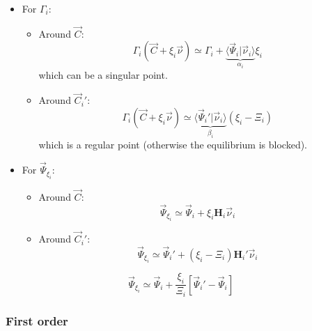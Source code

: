 \documentclass[aps,12pt]{revtex4}
\begin{document}
\begin{itemize} 
\item For $\Gamma_i$:%

\begin{itemize}
\item Around $\vec{C}$: 	
\begin{equation}
	\Gamma_i(\vec{C}+\xi_i\vec{\nu}) \simeq \Gamma_i + \underbrace{\langle \vec{\Psi}_i \vert \vec{\nu}_i\rangle}_{\alpha_i} \xi_i
\end{equation}
which can be a singular point.

\item Around $\vec{C}_i'$:
\begin{equation}
	\Gamma_i(\vec{C}+\xi_i\vec{\nu}) \simeq \underbrace{\langle \vec{\Psi}_i' \vert \vec{\nu}_i\rangle}_{\beta_i} (\xi_i-\Xi_i)
\end{equation}
which is a regular point (otherwise the equilibrium is blocked). 
\end{itemize}

\item For $\vec{\Psi}_{\xi_i}$: %

\begin{itemize}
\item Around $\vec{C}$: 	
	\begin{equation}
		\vec{\Psi}_{\xi_i} \simeq \vec{\Psi}_i + \xi_i \bm{H}_i \vec{\nu}_i
	\end{equation}

\item Around $\vec{C}_i'$:
		\begin{equation}
		\vec{\Psi}_{\xi_i} \simeq \vec{\Psi}_i' + (\xi_i-\Xi_i) \bm{H}_i' \vec{\nu}_i
	\end{equation}

\end{itemize}

\end{itemize}

\begin{equation}
	\vec{\Psi}_{\xi_i} \simeq \vec{\Psi}_i + \dfrac{\xi_i}{\Xi_i}\left[ \vec{\Psi}_i' - \vec{\Psi}_i \right]
\end{equation}


\subsubsection{First order}

 
\end{document}
